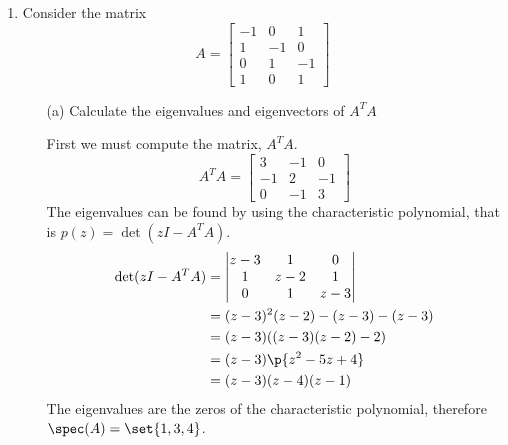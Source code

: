 \documentclass[11pt]{article}
\begin{document}
\begin{enumerate}
        \begin{proof}
            
        \end{proof}

    \item %
        Consider the matrix
        \[
            A =
            \begin{bmatrix}
                -1 &  0 &  1 \\
                 1 & -1 &  0 \\
                 0 &  1 & -1 \\
                 1 &  0 &  1
            \end{bmatrix}
        \]
        \begin{enumerate}
            \item[(a)] %
                Calculate the eigenvalues and eigenvectors of $A^T A$

                First we must compute the matrix, $A^T A$.
                \[
                    A^T A =
                    \begin{bmatrix}
                        3 & -1 & 0 \\
                        -1 & 2 & -1 \\
                        0 & -1 & 3
                    \end{bmatrix}
                \]
                The eigenvalues can be found by using the characteristic
                polynomial, that is $p(z) = \det(zI - A^T A)$.
                \begin{align*}
                    \det(zI - A^T A) &=
                    \begin{vmatrix}
                        z - 3 &    1 &     0 \\
                           1 & z - 2 &    1 \\
                            0 &    1 & z - 3
                    \end{vmatrix} \\
                    &= (z - 3)^2(z - 2) - (z - 3) - (z - 3) \\
                    &= (z - 3)((z - 3)(z - 2) - 2) \\
                    &= (z - 3)\p{z^2 - 5z + 4} \\
                    &= (z - 3)(z - 4)(z - 1)
                \end{align*}
                The eigenvalues are the zeros of the characteristic polynomial,
                therefore $\spec(A) = \set{1, 3, 4}$.


\end{enumerate}
\end{enumerate}
\end{document}
